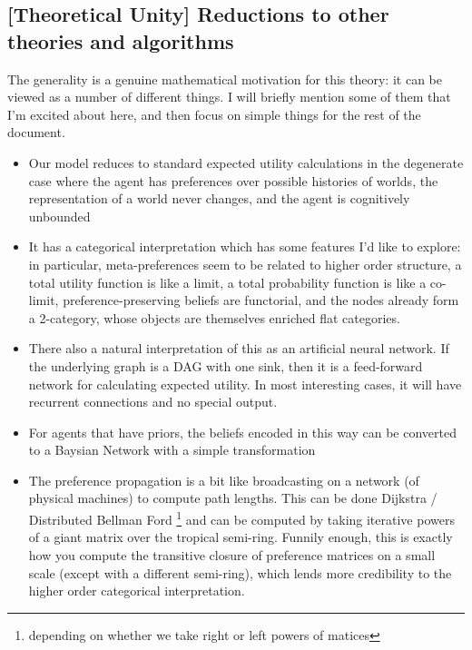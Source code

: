 \documentclass{article}
\begin{document}
	\subsection*{[Theoretical Unity] Reductions to other theories and algorithms}
	The generality is a genuine mathematical motivation for this theory: it can be viewed as a number of different things. I will briefly mention some of them that I'm excited about here, and then focus on simple things for the rest of the document.
	\begin{itemize}[nosep]
		\item Our model reduces to standard expected utility calculations in the degenerate case where the agent has preferences over possible histories of worlds, the representation of a world never changes, and the agent is cognitively unbounded
		\item It has a categorical interpretation which has some features I'd like to explore: in particular, meta-preferences seem to be related to higher order structure, a total utility function is like a limit, a total probability function is like a co-limit, preference-preserving beliefs are functorial, and the nodes already form a 2-category, whose objects are themselves enriched flat categories.
		\item There also a natural interpretation of this as an artificial neural network. If the underlying graph is a DAG with one sink, then it is a feed-forward network for calculating expected utility. In most interesting cases, it will have recurrent connections and no special output.
		\item For agents that have priors, the beliefs encoded in this way can be converted to a Baysian Network with a simple transformation
		\item The preference propagation is a bit like broadcasting on a network (of physical machines) to compute path lengths. This can be done Dijkstra / Distributed Bellman Ford \footnote{depending on whether we take right or left powers of matices} and can be computed by taking iterative powers of a giant matrix over the tropical semi-ring. Funnily enough, this is exactly how you compute the transitive closure of preference matrices on a small scale (except with a different semi-ring), which lends more credibility to the higher order categorical interpretation.
	\end{itemize}
	
\end{document}
